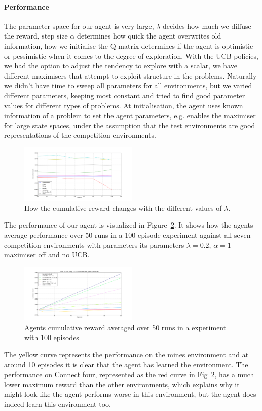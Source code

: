 \paragraph{Performance}
The parameter space for our agent is very large, $\lambda$ decides how much we
diffuse the reward, step size $\alpha$ determines how quick the agent overwrites
old information, how we initialise the Q matrix determines if the agent is
optimistic or pessimistic when it comes to the degree of exploration. With the
UCB policies, we had the option to adjust the tendency to explore with a scalar,
we have different maximisers that attempt to exploit structure in the problems.
Naturally we didn't have time to sweep all parameters for all environments, but
we varied different parameters, keeping most constant and tried to find good
parameter values for different types of problems. At initialisation, the agent
uses known information of a problem to set the agent parameters, e.g. enables
the maximiser for large state spaces, under the assumption that the test
environments are good representations of the competition environments.

\begin{figure}[h]
    \centering
    \includegraphics[width=0.5\textwidth]{../data/lambdasweepplot.png}
    \caption{How the cumulative reward changes with the different values of $\lambda$.}
    \label{fig:lambdasweep}
\end{figure}
The performance of our agent is visualized in Figure~\ref{fig:cumreward}. It shows how the agents average performance over 50 runs
in a 100 episode experiment against all seven competition environments with parameters its parameters $\lambda = 0.2$, $\alpha = 1$ maximiser off and no UCB.

\begin{figure}[h!]
    \centering
    \includegraphics[width=0.5\textwidth]{../data/100episodes_50runs.png}
    \caption{Agents cumulative reward averaged over 50 runs in a experiment with 100 episodes}
    \label{fig:cumreward}
\end{figure} 
The yellow curve represents the performance on the mines environment and at around 10 episodes it is clear that the agent has learned the environment. The performance on Connect four, represented as the red curve
in Fig~\ref{fig:cumreward}, has a much lower maximum reward than the other
environments, which explains why it might look like the agent performs worse in this environment, but the agent does indeed learn this environment too.

